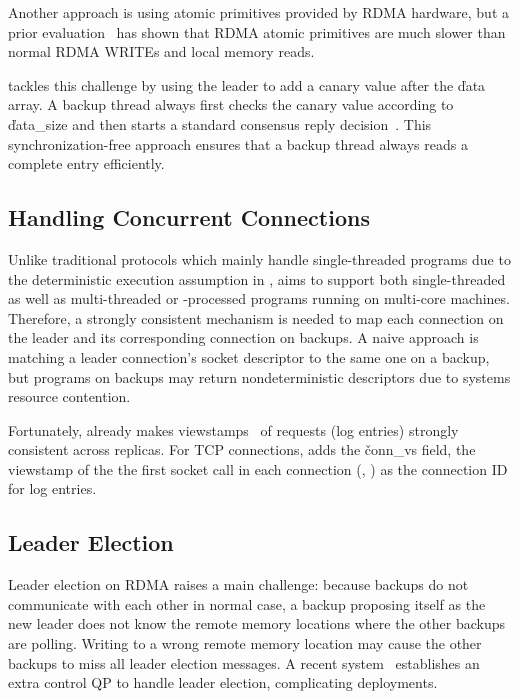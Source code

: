 Another approach is using atomic primitives provided by RDMA hardware, 
but a prior evaluation~\cite{drtm:sosp15} has shown that RDMA atomic 
primitives are much slower than normal RDMA WRITEs and local memory reads.

\xxx tackles this challenge by using the leader to add a canary value after 
the \v{data} array. A backup thread always first checks the canary value 
according to \v{data\_size} and then starts a standard \paxos consensus 
reply decision~\cite{paxos:practical}. This synchronization-free approach 
ensures that a \xxx backup thread always reads a complete entry efficiently.

\subsection{Handling Concurrent Connections} \label{sec:concurrent}

Unlike traditional \paxos protocols which mainly handle single-threaded 
programs due to the deterministic execution assumption in \smr, \xxx aims 
to support both single-threaded as well as multi-threaded or -processed 
programs running on multi-core machines. Therefore, a strongly consistent 
mechanism is needed to map each connection on the leader and 
its corresponding connection on backups. A naive approach is matching a 
leader connection's socket descriptor to the same one on a backup, but programs 
on backups may return nondeterministic descriptors due to systems resource 
contention.

Fortunately, \paxos already makes viewstamps~\cite{paxos:practical} of 
requests (log entries) strongly consistent across replicas. For TCP 
connections, \xxx adds the \v{conn\_vs} field, the viewstamp of the the first 
socket call in each connection (\ie, \accept) as the connection ID for log 
entries.

\subsection{Leader Election} \label{sec:election}

Leader election on RDMA raises a main challenge: because backups do not 
communicate with each other in normal case, a backup proposing itself as 
the new leader does not know the remote memory locations where the other 
backups are polling. Writing to a wrong remote memory location may cause the 
other backups to miss all leader election messages. A recent 
system~\cite{dare:hpdc15} establishes an extra control QP to handle leader 
election, complicating deployments.

